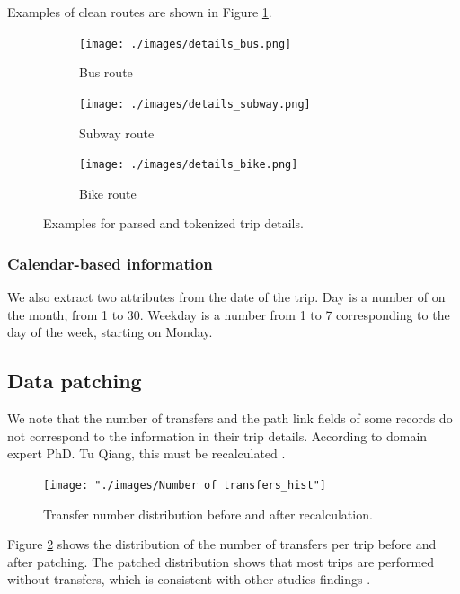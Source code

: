 \documentclass{article}
\begin{document}
Examples of clean routes are shown in Figure \ref{fig:preprocessing/parsed_routes}. %

\begin{figure}[H]
  \centering
  \begin{subfigure}[b]{.8\textwidth}
  	\centering
  	\texttt{[image: ./images/details\_bus.png]}
  	\caption{Bus route}
  \end{subfigure}
  \begin{subfigure}[b]{.8\textwidth}
  	\centering
  	\texttt{[image: ./images/details\_subway.png]}
  	\caption{Subway route}
  \end{subfigure}
    \begin{subfigure}[b]{.8\textwidth}
  	\centering
  	\texttt{[image: ./images/details\_bike.png]}
  	\caption{Bike route}
  \end{subfigure}
  \caption{Examples for parsed and tokenized trip details.}
  	\label{fig:preprocessing/parsed_routes}
\end{figure}

\subsubsection{Calendar-based information} %
We also extract two attributes from the date of the trip. Day is a number of on the month, from 1 to 30. Weekday is a number from 1 to 7 corresponding to the day of the week, starting on Monday.

\subsection{Data patching}
\label{sec:patching}
We note that the number of transfers and the path link fields of some records do not correspond to the information in their trip details. According to domain expert PhD. Tu Qiang, this must be recalculated \cite{tommy}. 

\begin{figure}[H]
  \centering
  \texttt{[image: "./images/Number of transfers\_hist"]}
  \caption{Transfer number distribution before and after recalculation.}
  \label{fig:preprocessing/num_transfers}
\end{figure}

Figure \ref{fig:preprocessing/num_transfers} shows the distribution of the number of transfers per trip before and after patching. The patched distribution shows that most trips are performed without transfers, which is consistent with other studies findings \cite{bhaskar2015passenger}.
\end{document}
